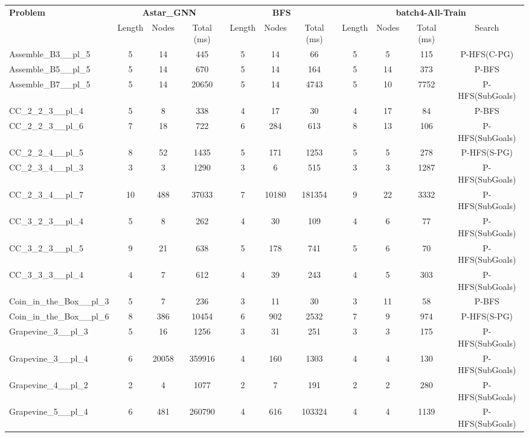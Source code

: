 \begin{table}[!ht]
\centering
\scriptsize
\begin{tabular}{l|ccc|ccc|cccc}
\multirow{2}{*}{\textbf{Problem}} & \multicolumn{3}{c|}{\textbf{Astar\_GNN}} & \multicolumn{3}{c|}{\textbf{BFS}} & \multicolumn{4}{c}{\textbf{batch4-All-Train}} \\
\cline{2-11}
& Length & Nodes & Total (ms) & Length & Nodes & Total (ms) & Length & Nodes & Total (ms) & Search \\
\hline
Assemble\_B3\_\_pl\_5 & 5 & 14 & 445 & 5 & 14 & 66 & 5 & 5 & 115 & P-HFS(C-PG) \\
Assemble\_B5\_\_pl\_5 & 5 & 14 & 670 & 5 & 14 & 164 & 5 & 14 & 373 & P-BFS \\
Assemble\_B7\_\_pl\_5 & 5 & 14 & 20650 & 5 & 14 & 4743 & 5 & 10 & 7752 & P-HFS(SubGoals) \\
CC\_2\_2\_3\_\_pl\_4 & 5 & 8 & 338 & 4 & 17 & 30 & 4 & 17 & 84 & P-BFS \\
CC\_2\_2\_3\_\_pl\_6 & 7 & 18 & 722 & 6 & 284 & 613 & 8 & 13 & 106 & P-HFS(SubGoals) \\
CC\_2\_2\_4\_\_pl\_5 & 8 & 52 & 1435 & 5 & 171 & 1253 & 5 & 5 & 278 & P-HFS(S-PG) \\
CC\_2\_3\_4\_\_pl\_3 & 3 & 3 & 1290 & 3 & 6 & 515 & 3 & 3 & 1287 & P-HFS(SubGoals) \\
CC\_2\_3\_4\_\_pl\_7 & 10 & 488 & 37033 & 7 & 10180 & 181354 & 9 & 22 & 3332 & P-HFS(SubGoals) \\
CC\_3\_2\_3\_\_pl\_4 & 5 & 8 & 262 & 4 & 30 & 109 & 4 & 6 & 77 & P-HFS(SubGoals) \\
CC\_3\_2\_3\_\_pl\_5 & 9 & 21 & 638 & 5 & 178 & 741 & 5 & 6 & 70 & P-HFS(SubGoals) \\
CC\_3\_3\_3\_\_pl\_4 & 4 & 7 & 612 & 4 & 39 & 243 & 4 & 5 & 303 & P-HFS(SubGoals) \\
Coin\_in\_the\_Box\_\_pl\_3 & 5 & 7 & 236 & 3 & 11 & 30 & 3 & 11 & 58 & P-BFS \\
Coin\_in\_the\_Box\_\_pl\_6 & 8 & 386 & 10454 & 6 & 902 & 2532 & 7 & 9 & 974 & P-HFS(S-PG) \\
Grapevine\_3\_\_pl\_3 & 5 & 16 & 1256 & 3 & 31 & 251 & 3 & 3 & 175 & P-HFS(SubGoals) \\
Grapevine\_3\_\_pl\_4 & 6 & 20058 & 359916 & 4 & 160 & 1303 & 4 & 4 & 130 & P-HFS(SubGoals) \\
Grapevine\_4\_\_pl\_2 & 2 & 4 & 1077 & 2 & 7 & 191 & 2 & 2 & 280 & P-HFS(SubGoals) \\
Grapevine\_5\_\_pl\_4 & 6 & 481 & 260790 & 4 & 616 & 103324 & 4 & 4 & 1139 & P-HFS(SubGoals) \\

\end{tabular}
\end{table}
